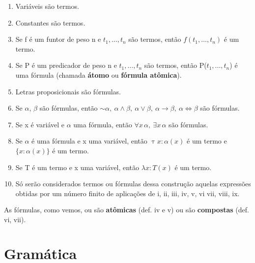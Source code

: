 \begin{enumerate}[label=\roman*)]
    \item Variáveis são termos.
    \item Constantes são termos.
    \item Se f é um funtor de peso n e $t_1, \dots, t_n$ são termos, então $f(t_1, \dots, t_n)$ é um termo.
    \item Se P é um predicador de peso n e $t_1, \dots, t_n$ são termos, então P($t_1, \dots, t_n$) é uma fórmula (chamada \textbf{átomo} ou \textbf{fórmula atômica}).
    \item Letras proposicionais são fórmulas.
    \item Se $\alpha$, $\beta$ são fórmulas, então $\sim \alpha,\ \alpha \land \beta,\ \alpha \lor \beta,\ \alpha \to \beta,\ \alpha \iff \beta$ são fórmulas.
    \item Se x é variável e $\alpha$ uma fórmula, então $\forall x \, \alpha,\ \exists x \, \alpha$ são fórmulas.
    \item Se $\alpha$ é uma fórmula e x uma variável, então $\uptau x \colon \alpha(x)$ é um termo e $\{ x \colon \alpha(x)\}$ é um termo.
    \item Se T é um termo e x uma variável, então $\lambda x \colon T(x)$ é um termo.
    \item Só serão considerados termos ou fórmulas dessa construção aquelas expressões obtidas por um número finito de aplicações de i, ii, iii, iv, v, vi vii, viii, ix.
\end{enumerate}


As fórmulas, como vemos, ou são \textbf{atômicas} (def. iv e v) ou são \textbf{compostas} (def. vi, vii).

\section{Gramática}

